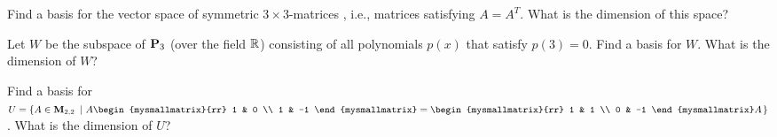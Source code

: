 \begin{ex}
  Find a basis for the vector space of symmetric $3\times 3$-matrices%
  , i.e., matrices satisfying $A=A^T$.
  What is the dimension of this space?
\end{ex}

\begin{ex}
  Let $W$ be the subspace of $\mathbf{P}_3$ (over the field $\mathbb{R}$)
  consisting of all polynomials $p(x)$ that satisfy $p(3)=0$.
  Find a basis for $W$. What is the dimension of $W$?
\end{ex}

\begin{ex}
  Find a basis for
  $U=\set{ A\in\Mat_{2,2} ~\left\vert~ A\begin{mysmallmatrix}{rr} 1 &
        0 \\ 1 & -1 \end{mysmallmatrix} = \begin{mysmallmatrix}{rr} 1
        & 1 \\ 0 & -1 \end{mysmallmatrix} A \right.}$.  What is the
  dimension of $U$?
\end{ex}

